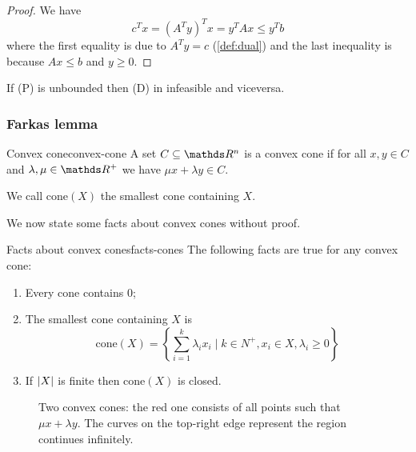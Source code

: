 \documentclass[12pt]{extarticle}
\begin{document}
\begin{proof}
	We have
	\begin{equation}
		c^T x = (A^T y)^T x = y^T A x \leq y^T b
	\end{equation}
	where the first equality is due to $A^T y = c$ (\cref{def:dual}) and the last
	inequality is because $Ax \leq b$ and $y \geq 0$.
\end{proof}

\begin{corollary}{}{}
	If (P) is unbounded then (D) in infeasible and viceversa.
\end{corollary}

\subsubsection{Farkas lemma}

\begin{definition}{Convex cone}{convex-cone}
	A set $C \subseteq \R^n$ is a convex cone if for all $x, y \in C$ and $\lambda, \mu \in \R^+$
	we have $\mu x + \lambda y \in C$.
\end{definition}

We call $\mathrm{cone}(X)$ the smallest cone containing $X$.

We now state some facts about convex cones without proof.

\begin{proposition}{Facts about convex cones}{facts-cones}
	The following facts are true for any convex cone:
	\begin{enumerate}[label=\roman*.]
		\item Every cone contains $0$;
		\item The smallest cone containing $X$ is
		      \begin{equation}
			      \mathrm{cone}(X) =
			      \left\{ \sum^k_{i = 1} \lambda_i x_i \mid k \in N^+, x_i \in X, \lambda_i \geq 0 \right\}
		      \end{equation}
		\item If $\abs{X}$ is finite then $\mathrm{cone}(X)$ is closed.
	\end{enumerate}
\end{proposition}

\begin{figure}[h!]
	\centering
	
	\caption{Two convex cones: the red one consists of all points such that $\mu x + \lambda y$.
		The curves on the top-right edge represent the region continues infinitely.}
\end{figure}
\end{document}
